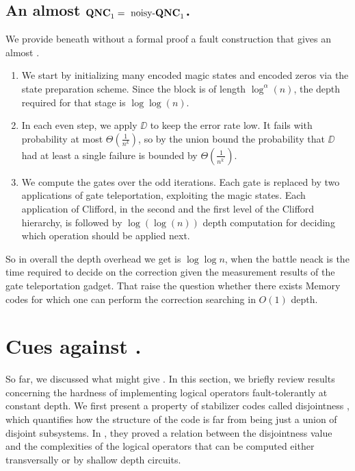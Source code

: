 \documentclass[manuscript,screen,review]{acmart}
\begin{document}
{%
  \subsection{An almost $\mathbf{QNC}_{1}{} = \text{ noisy-}\mathbf{QNC}_{1}{} $.}
  We provide beneath without a formal proof a fault construction that gives an almost \CDO. 
  \begin{enumerate}
    \item We start by initializing many encoded magic states and encoded zeros via the state preparation scheme. Since the block is of length $\log^{\alpha}(n)$, the depth required for that stage is $\log\log(n)$.
    \item In each even step, we apply $\DD$ to keep the error rate low. It fails with probability at most $\Theta\left(\frac{1}{n^k}\right)$, so by the union bound the probability that $\DD$ had at least a single failure is bounded by $\Theta(\frac{1}{n^{k^{\prime}}})$.
    \item We compute the gates over the odd iterations. Each gate is replaced by two applications of gate teleportation, exploiting the magic states. Each application of Clifford, in the second and the first level of the Clifford hierarchy, is followed by $\log(\log (n))$ depth computation for deciding which operation should be applied next.
  \end{enumerate}
  So in overall the depth overhead we get is $\log \log n$, when the battle neack is the time required to decide on the correction  given the measurement results of the gate teleportation gadget. That raise the question whether there exists Memory codes for which one can perform the correction searching in $O(1)$ depth. \cite{Gu_2024}  

  \newpage
  \section{ Cues against \CDO.  }\label{sec:passi}
So far, we discussed what might give \CDO. In this section, we briefly review results concerning the hardness of implementing logical operators fault-tolerantly at constant depth. 
We first present a property of stabilizer codes called disjointness \cite{bostanci2021findingdisjointnessstabilizercodes}, which quantifies how the structure of the code is far from being just a union of disjoint subsystems. In \cite{bostanci2021findingdisjointnessstabilizercodes}, they proved a relation between the disjointness value and the complexities of the logical operators that can be computed either transversally or by shallow depth circuits.


}
\end{document}
